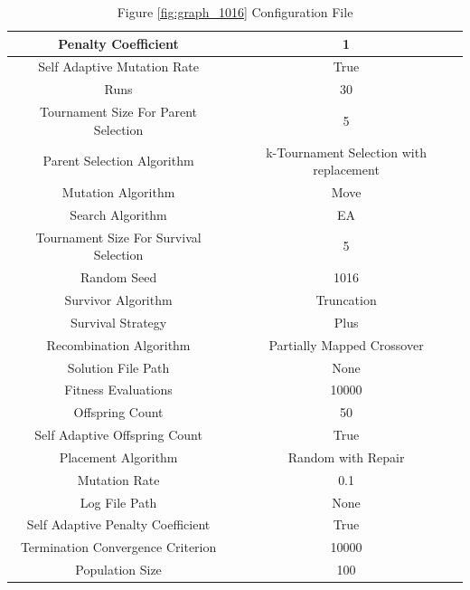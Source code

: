 \documentclass{standalone}
\begin{document}
\begin{table}[!htb]
	\centering
	\caption{Figure \ref{fig:graph_1016} Configuration File}
	\label{tab:graph_1016}
	\begin{tabular}{| c | c |}
		\hline
		Penalty Coefficient		& 1		 \\
		\hline
		Self Adaptive Mutation Rate		& True		 \\
		\hline
		Runs		& 30		 \\
		\hline
		Tournament Size For Parent Selection		& 5		 \\
		\hline
		Parent Selection Algorithm		& k-Tournament Selection with replacement		 \\
		\hline
		Mutation Algorithm		& Move		 \\
		\hline
		Search Algorithm		& EA		 \\
		\hline
		Tournament Size For Survival Selection		& 5		 \\
		\hline
		Random Seed		& 1016		 \\
		\hline
		Survivor Algorithm		& Truncation		 \\
		\hline
		Survival Strategy		& Plus		 \\
		\hline
		Recombination Algorithm		& Partially Mapped Crossover		 \\
		\hline
		Solution File Path		& None		 \\
		\hline
		Fitness Evaluations		& 10000		 \\
		\hline
		Offspring Count		& 50		 \\
		\hline
		Self Adaptive Offspring Count		& True		 \\
		\hline
		Placement Algorithm		& Random with Repair		 \\
		\hline
		Mutation Rate		& 0.1		 \\
		\hline
		Log File Path		& None		 \\
		\hline
		Self Adaptive Penalty Coefficient		& True		 \\
		\hline
		Termination Convergence Criterion		& 10000		 \\
		\hline
		Population Size		& 100		 \\
		\hline
	\end{tabular}
\end{table}
\end{document}
